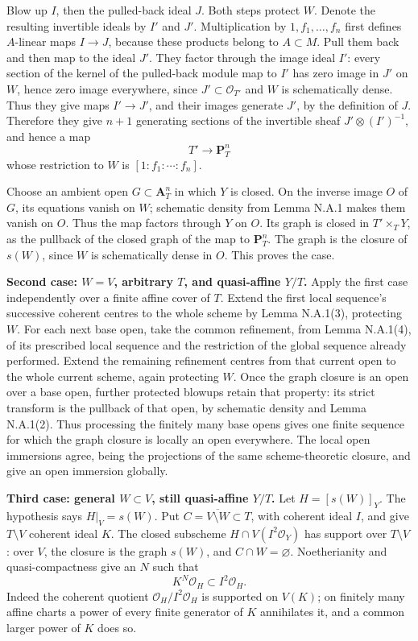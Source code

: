 \documentclass[11pt]{article}
\begin{document}
Blow up \(I\), then the pulled-back ideal \(J\). Both steps protect
\(W\). Denote the resulting invertible ideals by \(I'\) and \(J'\).
Multiplication by \(1,f_1,\ldots,f_n\) first defines \(A\)-linear maps
\(I\to J\), because these products belong to \(A\subset M\). Pull them
back and then map to the ideal \(J'\). They factor through the image
ideal \(I'\): every section of the kernel of the pulled-back module map
to \(I'\) has zero image in \(J'\) on \(W\), hence zero image
everywhere, since \(J'\subset\mathcal O_{T'}\) and \(W\) is
schematically dense. Thus they give maps \(I'\to J'\), and their images
generate \(J'\), by the definition of \(J\). Therefore they give \(n+1\)
generating sections of the invertible sheaf \(J'\otimes(I')^{-1}\), and
hence a map \[
T'\longrightarrow\mathbf P^n_T
\] whose restriction to \(W\) is \([1:f_1:\cdots:f_n]\).

Choose an ambient open \(G\subset\mathbf A^n_T\) in which \(Y\) is
closed. On the inverse image \(O\) of \(G\), its equations vanish on
\(W\); schematic density from Lemma N.A.1 makes them vanish on \(O\).
Thus the map factors through \(Y\) on \(O\). Its graph is closed in
\(T'\times_T Y\), as the pullback of the closed graph of the map to
\(\mathbf P^n_T\). The graph is the closure of \(s(W)\), since \(W\) is
schematically dense in \(O\). This proves the case.

\textbf{Second case: \(W=V\), arbitrary \(T\), and quasi-affine
\(Y/T\).} Apply the first case independently over a finite affine cover
of \(T\). Extend the first local sequence's successive coherent centres
to the whole scheme by Lemma N.A.1(3), protecting \(W\). For each next
base open, take the common refinement, from Lemma N.A.1(4), of its
prescribed local sequence and the restriction of the global sequence
already performed. Extend the remaining refinement centres from that
current open to the whole current scheme, again protecting \(W\). Once
the graph closure is an open over a base open, further protected blowups
retain that property: its strict transform is the pullback of that open,
by schematic density and Lemma N.A.1(2). Thus processing the finitely
many base opens gives one finite sequence for which the graph closure is
locally an open everywhere. The local open immersions agree, being the
projections of the same scheme-theoretic closure, and give an open
immersion globally.

\textbf{Third case: general \(W\subset V\), still quasi-affine \(Y/T\).}
Let \(H=[s(W)]_Y\). The hypothesis says \(H|_V=s(W)\). Put
\(C=\overline{V\setminus W}\subset T\), with coherent ideal \(I\), and
give \(T\setminus V\) coherent ideal \(K\). The closed subscheme
\(H\cap V(I^2\mathcal O_Y)\) has support over \(T\setminus V\): over
\(V\), the closure is the graph \(s(W)\), and \(C\cap W=\varnothing\).
Noetherianity and quasi-compactness give an \(N\) such that \[
K^N\mathcal O_H\subset I^2\mathcal O_H.
\tag{N.B.2}
\] Indeed the coherent quotient \(\mathcal O_H/I^2\mathcal O_H\) is
supported on \(V(K)\); on finitely many affine charts a power of every
finite generator of \(K\) annihilates it, and a common larger power of
\(K\) does so.
\end{document}
